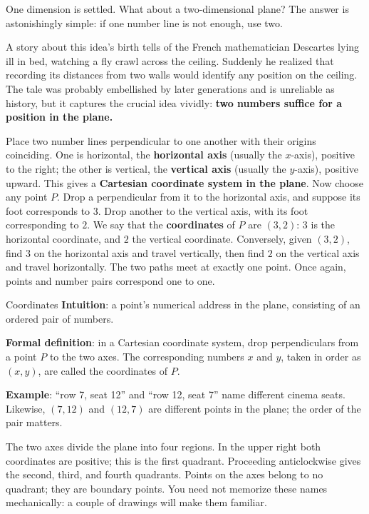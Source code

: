 One dimension is settled. What about a two-dimensional plane? The answer is astonishingly simple: if one number line is not enough, use two.

A story about this idea's birth tells of the French mathematician Descartes lying ill in bed, watching a fly crawl across the ceiling. Suddenly he realized that recording its distances from two walls would identify any position on the ceiling. The tale was probably embellished by later generations and is unreliable as history, but it captures the crucial idea vividly: \textbf{two numbers suffice for a position in the plane.}

Place two number lines perpendicular to one another with their origins coinciding. One is horizontal, the \textbf{horizontal axis} (usually the $x$-axis), positive to the right; the other is vertical, the \textbf{vertical axis} (usually the $y$-axis), positive upward. This gives a \textbf{Cartesian coordinate system in the plane}. Now choose any point $P$. Drop a perpendicular from it to the horizontal axis, and suppose its foot corresponds to $3$. Drop another to the vertical axis, with its foot corresponding to $2$. We say that the \textbf{coordinates} of $P$ are $(3,2)$: $3$ is the horizontal coordinate, and $2$ the vertical coordinate. Conversely, given $(3,2)$, find $3$ on the horizontal axis and travel vertically, then find $2$ on the vertical axis and travel horizontally. The two paths meet at exactly one point. Once again, points and number pairs correspond one to one.

\begin{shuyu}{Coordinates}
\textbf{Intuition}: a point's numerical address in the plane, consisting of an ordered pair of numbers.

\textbf{Formal definition}: in a Cartesian coordinate system, drop perpendiculars from a point $P$ to the two axes. The corresponding numbers $x$ and $y$, taken in order as $(x,y)$, are called the coordinates of $P$.

\textbf{Example}: ``row 7, seat 12'' and ``row 12, seat 7'' name different cinema seats. Likewise, $(7,12)$ and $(12,7)$ are different points in the plane; the order of the pair matters.
\end{shuyu}

The two axes divide the plane into four regions. In the upper right both coordinates are positive; this is the first quadrant. Proceeding anticlockwise gives the second, third, and fourth quadrants. Points on the axes belong to no quadrant; they are boundary points. You need not memorize these names mechanically: a couple of drawings will make them familiar.

